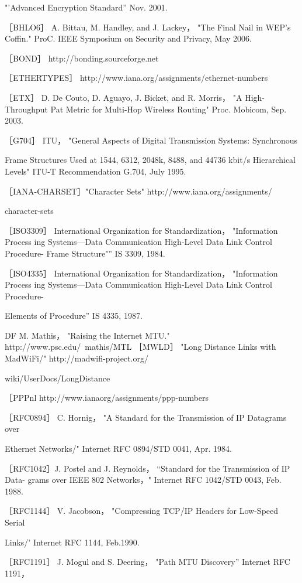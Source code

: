 "'Advanced Encryption Standard” Nov. 2001.

［BHLO6］ A. Bittau, M. Handley, and J. Lackey， "The Final Nail in WEP's Coffin."
ProC. IEEE Symposium on Security and Privacy, May 2006.

［BOND］ http://bonding.sourceforge.net

［ETHERTYPES］ http://www.iana.org/assignments/ethernet-numbers

［ETX］ D. De Couto, D. Aguayo, J. Bicket, and R. Morris， "A High-Throughput Pat
Metric for Multi-Hop Wireless Routing" Proc. Mobicom, Sep. 2003.

［G704］ ITU， "General Aspects of Digital Transmission Systems: Synchronous

Frame Structures Used at 1544, 6312, 2048k, 8488, and 44736 kbit/s Hierarchical
Levels" ITU-T Recommendation G.704, July 1995.

［IANA-CHARSET］"Character Sets" http://www.iana.org/assignments/

character-sets

［ISO3309］ International Organization for Standardization， "Information Process
ing Systems—Data Communication High-Level Data Link Control Procedure-
Frame Structure"” IS 3309, 1984.

［ISO4335］ International Organization for Standardization， "Information Process
ing Systems—Data Communication High-Level Data Link Control Procedure-

Elements of Procedure” IS 4335, 1987.

DF M. Mathis， "Raising the Internet MTU." http://www.psc.edu/~mathis/MTL
［MWLD］ "Long Distance Links with MadWiFi/" http://madwifi-project.org/

wiki/UserDocs/LongDistance

［PPPnl http://www.ianaorg/assignments/ppp-numbers

［RFC0894］ C. Hornig， "A Standard for the Transmission of IP Datagrams over

Ethernet Networks/" Internet RFC 0894/STD 0041, Apr. 1984.

［RFC1042］J. Postel and J. Reynolds， “Standard for the Transmission of IP Data-
grams over IEEE 802 Networks，" Internet RFC 1042/STD 0043, Feb. 1988.

［RFC1144］ V. Jacobson， "Compressing TCP/IP Headers for Low-Speed Serial

Links/' Internet RFC 1144, Feb.1990.

［RFC1191］ J. Mogul and S. Deering， "Path MTU Discovery” Internet RFC 1191，

